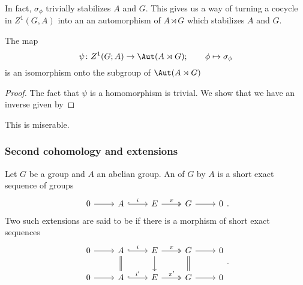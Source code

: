 \documentclass[main.tex]{subfiles}
\begin{document}
In fact, $\sigma_{\phi}$ trivially stabilizes $A$ and $G$. This gives us a way of turning a cocycle in $Z^{1}(G, A)$ into an an automorphism of $A \rtimes G$ which stabilizes $A$ and $G$.

\begin{proposition}
  The map
  \begin{equation*}
    \psi\colon Z^{1}(G; A) \to \Aut(A \rtimes G);\qquad \phi \mapsto \sigma_{\phi}
  \end{equation*}
  is an isomorphism onto the subgroup of $\Aut(A \rtimes G)$
\end{proposition}
\begin{proof}
  The fact that $\psi$ is a homomorphism is trivial. We show that we have an inverse given by
\end{proof}

This is miserable.

\subsubsection{Second cohomology and extensions}
\label{sss:second_cohomology_and_extensions}

\begin{definition}
  \label{def:extension_of_a_group}
  Let $G$ be a group and $A$ an abelian group. An  of $G$ by $A$ is a short exact sequence of groups
  \begin{equation*}
    \begin{tikzcd}
      0
      \arrow[r]
      & A
      \arrow[r, hook, "i"]
      & E
      \arrow[r, two heads, "\pi"]
      & G
      \arrow[r]
      & 0
    \end{tikzcd}.
  \end{equation*}
  Two such extensions are said to be  if there is a morphism of short exact sequences
  \begin{equation*}
    \begin{tikzcd}
      0
      \arrow[r]
      & A
      \arrow[r, hook, "i"]
      \arrow[d, equals]
      & E
      \arrow[r, two heads, "\pi"]
      \arrow[d]
      & G
      \arrow[r]
      \arrow[d, equals]
      & 0
      \\
      0
      \arrow[r]
      & A
      \arrow[r, hook, "i'"]
      & E
      \arrow[r, two heads, "\pi'"]
      & G
      \arrow[r]
      & 0
    \end{tikzcd}.
  \end{equation*}
\end{definition}
\end{document}
